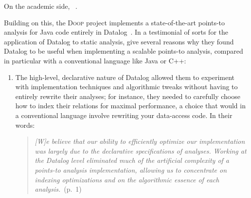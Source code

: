 On the academic side, ~\citep{whaley-lam,DBLP:conf/aplas/WhaleyACL05}.

Building on this, the \textsc{Doop} project implements a state-of-the-art
points-to analysis for Java code entirely in Datalog~\citep{DBLP:conf/oopsla/BravenboerS09}.
%
In a testimonial of sorts for the application of Datalog to static analysis,
\citet{DBLP:conf/datalog/SmaragdakisB10} give several reasons why they found
Datalog to be useful when implementing a scalable points-to analysis, compared
in particular with a conventional language like Java or C++:

\begin{enumerate}

\item The high-level, declarative nature of Datalog allowed them to experiment
  with implementation techniques and algorithmic tweaks without having to
  entirely rewrite their analyses; for instance, they needed to carefully choose
  how to index their relations for maximal performance, a choice that would in a
  conventional language involve rewriting your data-access code.
%
  In their words:
  \nopagebreak[1]
  \begin{quote}
    \emph{[W]e believe that our ability to efficiently optimize our
      implementation was largely due to the declarative specifications of
      analyses. Working at the Datalog level eliminated much of the artificial
      complexity of a points-to analysis implementation, allowing us to
      concentrate on indexing optimizations and on the algorithmic essence of
      each analysis.}~(p.~1)
  \end{quote}
  


\end{enumerate}
